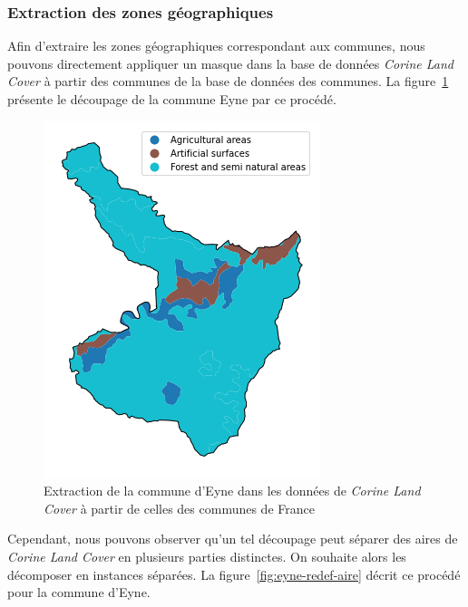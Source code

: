 \subsubsection{Extraction des zones géographiques}

Afin d'extraire les zones géographiques correspondant aux communes, nous pouvons directement appliquer un masque dans la base de données \emph{Corine Land Cover} à partir des communes de la base de données des communes.
La figure~\ref{fig:eyne-decoupe-brute} présente le découpage de la commune Eyne par ce procédé.

\begin{figure}[!h]
    \centering
    \includegraphics[scale=0.5]{images/eyne-decoupe-brute}
    \caption{Extraction de la commune d'Eyne dans les données de \emph{Corine Land Cover} à partir de celles des communes de France}
    \label{fig:eyne-decoupe-brute}
\end{figure}

Cependant, nous pouvons observer qu'un tel découpage peut séparer des aires de \emph{Corine Land Cover} en plusieurs parties distinctes.
On souhaite alors les décomposer en instances séparées.
La figure~\ref{fig:eyne-redef-aire} décrit ce procédé pour la commune d'Eyne.

